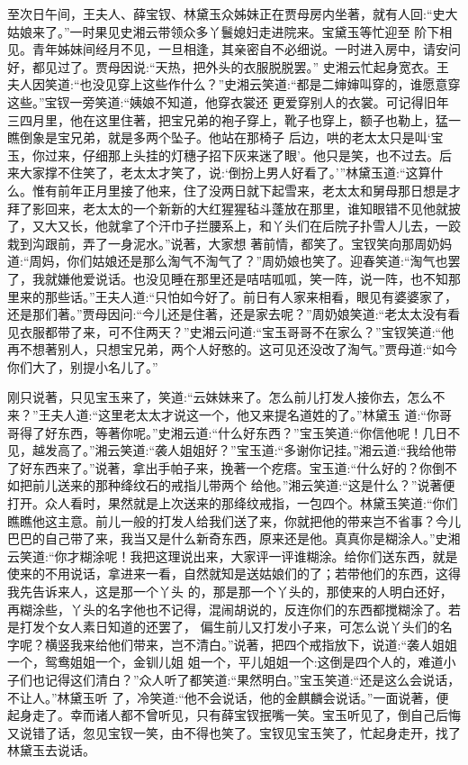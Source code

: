 \begin{parag}
    至次日午间，王夫人、薛宝钗、林黛玉众姊妹正在贾母房内坐著，就有人回:“史大姑娘来了。”一时果见史湘云带领众多丫鬟媳妇走进院来。宝黛玉等忙迎至 阶下相见。青年姊妹间经月不见，一旦相逢，其亲密自不必细说。一时进入房中，请安问好，都见过了。贾母因说:“天热，把外头的衣服脱脱罢。” 史湘云忙起身宽衣。王夫人因笑道:“也没见穿上这些作什么？”史湘云笑道:“都是二婶婶叫穿的，谁愿意穿这些。”宝钗一旁笑道:“姨娘不知道，他穿衣裳还 更爱穿别人的衣裳。可记得旧年三四月里，他在这里住著，把宝兄弟的袍子穿上，靴子也穿上，额子也勒上，猛一瞧倒象是宝兄弟，就是多两个坠子。他站在那椅子 后边，哄的老太太只是叫‘宝玉，你过来，仔细那上头挂的灯穗子招下灰来迷了眼’。他只是笑，也不过去。后来大家撑不住笑了，老太太才笑了，说:‘倒扮上男人好看了。’”林黛玉道:“这算什么。惟有前年正月里接了他来，住了没两日就下起雪来，老太太和舅母那日想是才拜了影回来，老太太的一个新新的大红猩猩毡斗蓬放在那里，谁知眼错不见他就披了，又大又长，他就拿了个汗巾子拦腰系上，和丫头们在后院子扑雪人儿去，一跤栽到沟跟前，弄了一身泥水。”说著，大家想 著前情，都笑了。宝钗笑向那周奶妈道:“周妈，你们姑娘还是那么淘气不淘气了？”周奶娘也笑了。迎春笑道:“淘气也罢了，我就嫌他爱说话。也没见睡在那里还是咭咭呱呱，笑一阵，说一阵，也不知那里来的那些话。”王夫人道:“只怕如今好了。前日有人家来相看，眼见有婆婆家了，还是那们著。”贾母因问:“今儿还是住著，还是家去呢？”周奶娘笑道:“老太太没有看见衣服都带了来，可不住两天？”史湘云问道:“宝玉哥哥不在家么？”宝钗笑道:“他再不想著别人，只想宝兄弟，两个人好憨的。这可见还没改了淘气。”贾母道:“如今你们大了，别提小名儿了。”
\end{parag}


\begin{parag}
    刚只说著，只见宝玉来了，笑道:“云妹妹来了。怎么前儿打发人接你去，怎么不来？”王夫人道:“这里老太太才说这一个，他又来提名道姓的了。”林黛玉 道:“你哥哥得了好东西，等著你呢。”史湘云道:“什么好东西？”宝玉笑道:“你信他呢！几日不见，越发高了。”湘云笑道:“袭人姐姐好？”宝玉道:“多谢你记挂。”湘云道:“我给他带了好东西来了。”说著，拿出手帕子来，挽著一个疙瘩。宝玉道:“什么好的？你倒不如把前儿送来的那种绛纹石的戒指儿带两个 给他。”湘云笑道:“这是什么？”说著便打开。众人看时，果然就是上次送来的那绛纹戒指，一包四个。林黛玉笑道:“你们瞧瞧他这主意。前儿一般的打发人给我们送了来，你就把他的带来岂不省事？今儿巴巴的自己带了来，我当又是什么新奇东西，原来还是他。真真你是糊涂人。”史湘云笑道:“你才糊涂呢！我把这理说出来，大家评一评谁糊涂。给你们送东西，就是使来的不用说话，拿进来一看，自然就知是送姑娘们的了；若带他们的东西，这得我先告诉来人，这是那一个丫头 的，那是那一个丫头的，那使来的人明白还好，再糊涂些，丫头的名字他也不记得，混闹胡说的，反连你们的东西都搅糊涂了。若是打发个女人素日知道的还罢了， 偏生前儿又打发小子来，可怎么说丫头们的名字呢？横竖我来给他们带来，岂不清白。”说著，把四个戒指放下，说道:“袭人姐姐一个，鸳鸯姐姐一个，金钏儿姐 姐一个，平儿姐姐一个:这倒是四个人的，难道小子们也记得这们清白？”众人听了都笑道:“果然明白。”宝玉笑道:“还是这么会说话，不让人。”林黛玉听 了，冷笑道:“他不会说话，他的金麒麟会说话。”一面说著，便起身走了。幸而诸人都不曾听见，只有薛宝钗抿嘴一笑。宝玉听见了，倒自己后悔又说错了话，忽见宝钗一笑，由不得也笑了。宝钗见宝玉笑了，忙起身走开，找了林黛玉去说话。
\end{parag}


